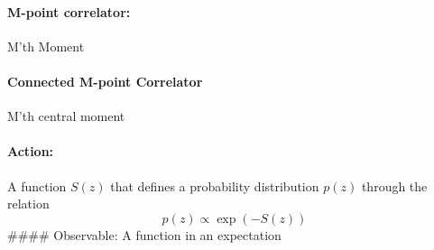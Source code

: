 \hypertarget{m-point-correlator}{%
\paragraph{M-point correlator:}\label{m-point-correlator}}

M'th Moment

\hypertarget{connected-m-point-correlator}{%
\paragraph{Connected M-point
Correlator}\label{connected-m-point-correlator}}

M'th central moment

\hypertarget{action}{%
\paragraph{Action:}\label{action}}

A function \(S(z)\) that defines a probability distribution \(p(z)\)
through the relation \[
p(z) \propto \exp(-S(z))
\] \#\#\#\# Observable: A function in an expectation
